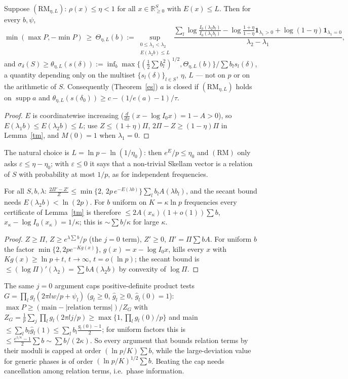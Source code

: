 \documentclass[11pt]{article}
\theoremstyle{remark}\newtheorem{remark}[theorem]{Remark}
\begin{document}
\begin{proposition}\label{cond}
Suppose $(\mathrm{RM}_{\eta,L})$: $\rho(x)\le\eta<1$ for all $x\in\mathbb R^S_{\ge0}$ with $E(x)\le L$.  Then for every $b,\psi$,
\[\min(\max P,-\min P)\ \ge\ \Theta_{\eta,L}(b):=\sup_{\substack{0\le\lambda_1<\lambda_2\\E(\lambda_2b)\le L}}
\frac{\sum_l\log\frac{I_0(\lambda_2b_l)}{I_0(\lambda_1b_l)}-\log\frac{1+\eta}{1-\eta}\mathbf 1_{\lambda_1>0}+\log(1-\eta)\mathbf 1_{\lambda_1=0}}{\lambda_2-\lambda_1},\]
and $\sigma_\delta(S)\ge\theta_{\eta,L}(s(\delta)):=\inf_b\max\{(\frac12\sum b_l^2)^{1/2},\Theta_{\eta,L}(b)\}/\sum b_ls_l(\delta)$, a quantity depending only on the
multiset $\{s_l(\delta)\}_{l\in S}$, $\eta$, $L$ --- not on $p$ or on the arithmetic of $S$.  Consequently (Theorem~\ref{es}) $a$ is closed if $(\mathrm{RM}_{\eta,L})$
holds on $\operatorname{supp}a$ and $\theta_{\eta,L}(s(\delta_0))\ge c-(1/e(a)-1)/\tau$.
\end{proposition}
\begin{proof}
$E$ is coordinatewise increasing ($\frac{d}{dx}(x-\log I_0x)=1-A>0$), so $E(\lambda_1b)\le E(\lambda_2b)\le L$; use $Z\le(1+\eta)\Pi$, $2\Pi-Z\ge(1-\eta)\Pi$ in
Lemma~\ref{tm}, and $M(0)=1$ when $\lambda_1=0$.
\end{proof}
The natural choice is $L=\ln p-\ln(1/\eta_0)$: then $e^{E}/p\le\eta_0$ and $(\mathrm{RM})$ only asks $\varepsilon\le\eta-\eta_0$; with $\varepsilon\le0$ it says that a
non-trivial Skellam vector is a relation of $S$ with probability at most $1/p$, as for independent frequencies.

\begin{proposition}[the $j=0$ barrier]\label{barrier}
For all $S,b,\lambda$: $\frac{2\Pi'-Z'}{Z}\le\min\{2,\,2p\,e^{-E(\lambda b)}\}\sum_lb_lA(\lambda b_l)$, and the secant bound needs $E(\lambda_2b)<\ln(2p)$.  For $b$ uniform on
$K=\kappa\ln p$ frequencies every certificate of Lemma~\ref{tm} is therefore $\le2A(x_\kappa)(1+o(1))\sum b$, $x_\kappa-\log I_0(x_\kappa)=1/\kappa$; this is $\sim\sum b/\kappa$ for large $\kappa$.
\end{proposition}
\begin{proof}
$Z\ge\Pi$, $Z\ge e^{\lambda\sum b}/p$ (the $j=0$ term), $Z'\ge0$, $\Pi'=\Pi\sum bA$.  For uniform $b$ the factor $\min\{2,2pe^{-Kg(x)}\}$, $g(x)=x-\log I_0x$, kills every
$x$ with $Kg(x)\ge\ln p+t$, $t\to\infty$, $t=o(\ln p)$; the secant bound is $\le(\log\Pi)'(\lambda_2)=\sum bA(\lambda_2b)$ by convexity of $\log\Pi$.
\end{proof}
The same $j=0$ argument caps positive-definite product tests $G=\prod_lg_l(2\pi lw/p+\psi_l)$ ($g_l\ge0$, $\hat g_l\ge0$, $\hat g_l(0)=1$):
$\max P\ge(\text{main}-|\text{relation terms}|)/Z_G$ with $Z_G=\frac1p\sum_j\prod_lg_l(2\pi lj/p)\ge\max\{1,\prod_lg_l(0)/p\}$ and main $\le\sum_lb_l\hat g_l(1)\le\sum_lb_l\frac{g_l(0)-1}2$;
for uniform factors this is $\le\frac{e^{1/\kappa}-1}2\sum b\sim\sum b/(2\kappa)$.  So every argument that bounds relation terms by their moduli is capped at order
$(\ln p/K)\sum b$, while the large-deviation value for generic phases is of order $(\ln p/K)^{1/2}\sum b$.  Beating the cap needs cancellation among
relation terms, i.e.\ phase information.
\end{document}
